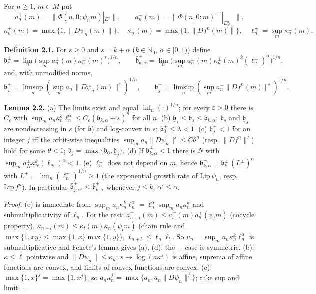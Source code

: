 \documentclass[11pt,a4paper]{article}
\theoremstyle{plain}
\theoremstyle{definition}
\theoremstyle{remark}
\numberwithin{equation}{section}
\numberwithin{figure}{section}
\begin{document}
For $n\ge1$, $m\in M$ put
\[
a^+_n(m)=\|\Phi(n,0;\psi_nm)|_{E^s}\|,\qquad
a^-_n(m)=\|\Phi(n,0;m)^{-1}|_{E^u_{f^nm}}\|,
\]
\[
\kappa^+_n(m)=\max\{1,\|D\psi_n(m)\|\},\quad
\kappa^-_n(m)=\max\{1,\|Df^n(m)\|\},\quad
\ell^\pm_n=\sup_m\kappa^\pm_n(m).
\]

\textbf{Definition 2.1.} For $s\ge0$ and $s=k+\alpha$ ($k\in\mathbb N_0$, $\alpha\in[0,1)$) define
\[
\mathfrak b^\pm_s=\lim_n\Big(\sup_m a^\pm_n(m)\kappa^\pm_n(m)^s\Big)^{1/n},
\qquad
\bar{\mathfrak b}^\pm_{k,\alpha}=\lim_n\Big(\sup_m a^\pm_n(m)\kappa^\pm_n(m)^k(\ell^\pm_n)^\alpha\Big)^{1/n},
\]
and, with unmodified norms,
\[
\underline{\mathfrak b}^+_s=\limsup_n(\sup_ma^+_n\|D\psi_n(m)\|^s)^{1/n},
\qquad
\underline{\mathfrak b}^-_s=\limsup_n(\sup_ma^-_n\|Df^n(m)\|^s)^{1/n}.
\]

\textbf{Lemma 2.2.} (a) The limits exist and equal $\inf_n(\cdot)^{1/n}$; for every $\varepsilon>0$ there is $C_\varepsilon$ with $\sup_ma_n\kappa_n^k\ell_n^\alpha\le C_\varepsilon(\bar{\mathfrak b}_{k,\alpha}+\varepsilon)^n$ for all $n$.
(b) $\underline{\mathfrak b}_s\le\mathfrak b_s\le\bar{\mathfrak b}_{k,\alpha}$; $\mathfrak b_s$ and $\underline{\mathfrak b}_s$ are nondecreasing in $s$ (for $\mathfrak b$) and log-convex in $s$; $\mathfrak b_0^\pm\le\lambda<1$.
(c) $\mathfrak b^\pm_j<1$ for an integer $j$ iff the orbit-wise inequalities $\sup_ma_n\|D\psi_n\|^{j}\le C\theta^n$ (resp. $\|Df^n\|^j$) hold for some $\theta<1$; $\mathfrak b_j=\max\{\mathfrak b_0,\underline{\mathfrak b}_j\}$.
(d) If $\bar{\mathfrak b}^\pm_{k,\alpha}<1$ there is $N$ with $\sup_ma^\pm_N\kappa_N^k(\ell_N)^\alpha<1$.
(e) $\ell^\pm_n$ does not depend on $m$, hence $\bar{\mathfrak b}^\pm_{k,\alpha}=\mathfrak b^\pm_k\,(L^\pm)^\alpha$ with $L^\pm=\lim_n(\ell^\pm_n)^{1/n}\ge1$ (the exponential growth rate of $\mathrm{Lip}\,\psi_n$, resp. $\mathrm{Lip}\,f^n$). In particular $\bar{\mathfrak b}^\pm_{j,\alpha'}\le\bar{\mathfrak b}^\pm_{k,\alpha}$ whenever $j\le k$, $\alpha'\le\alpha$.

\textit{Proof.} (e) is immediate from $\sup_m a_n\kappa_n^k\ell_n^\alpha=\ell_n^\alpha\sup_ma_n\kappa_n^k$ and submultiplicativity of $\ell_n$. For the rest: $a^+_{n+l}(m)\le a^+_l(m)a^+_n(\psi_lm)$ (cocycle property), $\kappa_{n+l}(m)\le\kappa_l(m)\kappa_n(\psi_lm)$ (chain rule and $\max\{1,xy\}\le\max\{1,x\}\max\{1,y\}$), $\ell_{n+l}\le\ell_n\ell_l$. So $u_n=\sup_ma_n\kappa_n^k\ell_n^\alpha$ is submultiplicative and Fekete's lemma gives (a), (d); the $-$ case is symmetric. (b): $\kappa\le\ell$ pointwise and $\|D\psi_n\|\le\kappa_n$; $s\mapsto\log(a\kappa^s)$ is affine, suprema of affine functions are convex, and limits of convex functions are convex. (c): $\max\{1,x\}^j=\max\{1,x^j\}$, so $a_n\kappa_n^j=\max\{a_n,a_n\|D\psi_n\|^j\}$; take sup and limit. $\square$
\end{document}
